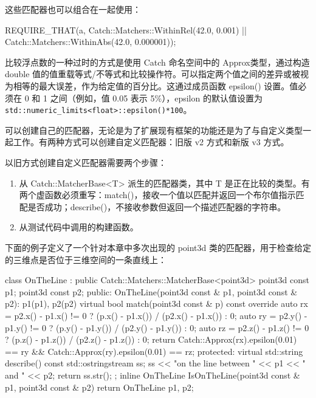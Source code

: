 这些匹配器也可以组合在一起使用：

\begin{cpp}
REQUIRE_THAT(a,
    Catch::Matchers::WithinRel(42.0, 0.001) ||
    Catch::Matchers::WithinAbs(42.0, 0.000001));
\end{cpp}

比较浮点数的一种过时的方式是使用 Catch 命名空间中的 Approx类型，通过构造 double 值的值重载等式/不等式和比较操作符。可以指定两个值之间的差异或被视为相等的最大误差，作为给定值的百分比。这通过成员函数 epsilon() 设置。值必须在 0 和 1 之间（例如，值 0.05 表示 5\%），epsilon 的默认值设置为 \verb|std::numeric_limits<float>::epsilon()*100|。

可以创建自己的匹配器，无论是为了扩展现有框架的功能还是为了与自定义类型一起工作。有两种方式可以创建自定义匹配器：旧版 v2 方式和新版 v3 方式。

以旧方式创建自定义匹配器需要两个步骤：

\begin{enumerate}
\item
从 Catch::MatcherBase<T> 派生的匹配器类，其中 T 是正在比较的类型。有两个虚函数必须重写：match()，接收一个值以匹配并返回一个布尔值指示匹配是否成功；describe()，不接收参数但返回一个描述匹配器的字符串。

\item
从测试代码中调用的构建函数。
\end{enumerate}

下面的例子定义了一个针对本章中多次出现的 point3d 类的匹配器，用于检查给定的三维点是否位于三维空间的一条直线上：

\begin{cpp}
class OnTheLine : public Catch::Matchers::MatcherBase<point3d>
{
    point3d const p1;
    point3d const p2;
public:
    OnTheLine(point3d const & p1, point3d const & p2):
        p1(p1), p2(p2)
    {}
    virtual bool match(point3d const & p) const override
    {
        auto rx = p2.x() - p1.x() != 0 ?
                  (p.x() - p1.x()) / (p2.x() - p1.x()) : 0;
        auto ry = p2.y() - p1.y() != 0 ?
                  (p.y() - p1.y()) / (p2.y() - p1.y()) : 0;
        auto rz = p2.z() - p1.z() != 0 ?
                  (p.z() - p1.z()) / (p2.z() - p1.z()) : 0;
        return
            Catch::Approx(rx).epsilon(0.01) == ry &&
            Catch::Approx(ry).epsilon(0.01) == rz;
    }
protected:
    virtual std::string describe() const
    {
        std::ostringstream ss;
        ss << "on the line between " << p1 << " and " << p2;
        return ss.str();
    }
};
inline OnTheLine IsOnTheLine(point3d const & p1, point3d const & p2)
{
    return OnTheLine {p1, p2};
}
\end{cpp}

